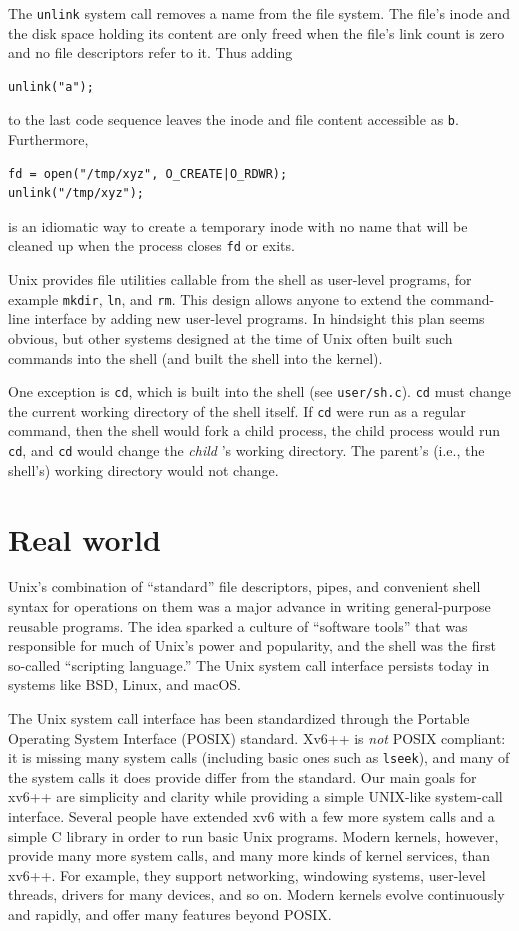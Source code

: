 The
\lstinline{unlink}
system call removes a name from the file system.
The file's inode and the disk space holding its content
are only freed when the file's link count is zero and
no file descriptors refer to it.
Thus adding
\begin{lstlisting}[]
unlink("a");
\end{lstlisting}
to the last code sequence leaves the inode
and file content accessible as
\lstinline{b}.
Furthermore,
\begin{lstlisting}[]
fd = open("/tmp/xyz", O_CREATE|O_RDWR);
unlink("/tmp/xyz");
\end{lstlisting}
is an idiomatic way to create a temporary inode
with no name
that will be cleaned up when the process closes
\lstinline{fd}
or exits.

Unix provides
file utilities callable from the shell
as user-level programs, for example
\lstinline{mkdir},
\lstinline{ln},
and
\lstinline{rm}.
This design allows anyone to extend the command-line interface
by adding new user-level programs.  In hindsight this plan seems obvious,
but other systems designed at the time of Unix often built such commands into
the shell (and built the shell into the kernel).

One exception is
\lstinline{cd},
which is built into the shell
(see \texttt{user/sh.c}).
\lstinline{cd}
must change the current working directory of the
shell itself.  If
\lstinline{cd}
were run as a regular command, then the shell would fork a child
process, the child process would run
\lstinline{cd},
and
\lstinline{cd}
would change the
\textit{child} 's
working directory.  The parent's (i.e.,
the shell's) working directory would not change.

\section{Real world}

Unix's combination of ``standard'' file
descriptors, pipes, and convenient shell syntax for
operations on them was a major advance in writing
general-purpose reusable programs.
The idea sparked a culture of ``software tools'' that was
responsible for much of Unix's power and popularity,
and the shell was the first so-called ``scripting language.''
The Unix system call interface persists today in systems like
BSD, Linux, and macOS.

The Unix system call interface has been standardized through the Portable
Operating System Interface (POSIX) standard.
Xv6++ is
\textit{not}
POSIX compliant:  it is missing many system calls (including basic ones such as
\lstinline{lseek}),
and many of the system calls it does provide differ from the standard.
Our main goals for xv6++ are
simplicity and clarity while providing a simple UNIX-like system-call interface.
Several people have extended xv6 with a few more system calls and a simple
C library in order to run basic Unix programs.  Modern kernels, however,
provide many more system calls, and many more kinds of kernel services, than
xv6++.  For example, they support networking, windowing systems, user-level threads,
drivers for many devices, and so on.  Modern kernels evolve continuously and
rapidly, and offer many features beyond POSIX.

